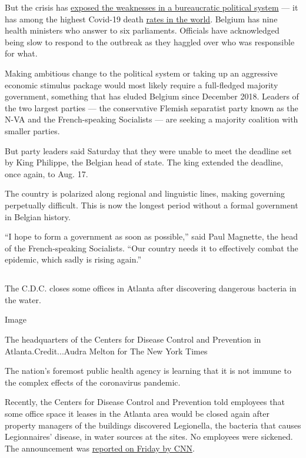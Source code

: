 But the crisis has
\href{https://www.nytimes.com/2020/08/08/world/europe/coronavirus-nursing-homes-elderly.html}{exposed
the weaknesses in a bureaucratic political system} --- it has among the
highest Covid-19 death
\href{https://www.nytimes.com/interactive/2020/world/coronavirus-maps.html}{rates
in the world}. Belgium has nine health ministers who answer to six
parliaments. Officials have acknowledged being slow to respond to the
outbreak as they haggled over who was responsible for what.

Making ambitious change to the political system or taking up an
aggressive economic stimulus package would most likely require a
full-fledged majority government, something that has eluded Belgium
since December 2018. Leaders of the two largest parties --- the
conservative Flemish separatist party known as the N-VA and the
French-speaking Socialists --- are seeking a majority coalition with
smaller parties.

But party leaders said Saturday that they were unable to meet the
deadline set by King Philippe, the Belgian head of state. The king
extended the deadline, once again, to Aug. 17.

The country is polarized along regional and linguistic lines, making
governing perpetually difficult. This is now the longest period without
a formal government in Belgian history.

``I hope to form a government as soon as possible,'' said Paul Magnette,
the head of the French-speaking Socialists. ``Our country needs it to
effectively combat the epidemic, which sadly is rising again.''

\hypertarget{section-8}{%
\subsection{}\label{section-8}}

The C.D.C. closes some offices in Atlanta after discovering dangerous
bacteria in the water.

Image

The headquarters of the Centers for Disease Control and Prevention in
Atlanta.Credit...Audra Melton for The New York Times

The nation's foremost public health agency is learning that it is not
immune to the complex effects of the coronavirus pandemic.

Recently, the Centers for Disease Control and Prevention told employees
that some office space it leases in the Atlanta area would be closed
again after property managers of the buildings discovered Legionella,
the bacteria that causes Legionnaires' disease, in water sources at the
sites. No employees were sickened. The announcement was
\href{https://www.cnn.com/2020/08/07/health/coronavirus-legionnaires-water-cdc/index.html}{reported
on Friday by CNN}.

